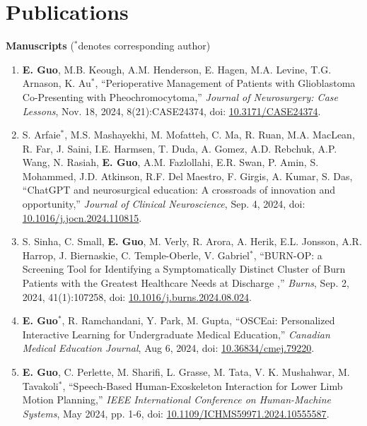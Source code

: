 \documentclass{article}
\begin{document}
\section*{\textcolor{my_colour}{Publications}}
\vspace{-.25em} \hrulefill \vspace{.25em}

\textbf{Manuscripts} ($^*$denotes corresponding author) \vspace{.5em}

\begin{enumerate}
    \item \textbf{E. Guo}, M.B. Keough, A.M. Henderson, E. Hagen, M.A. Levine, T.G. Arnason, K. Au$^*$, ``Perioperative Management of Patients with Glioblastoma Co-Presenting with Pheochromocytoma,'' \textit{Journal of Neurosurgery: Case Lessons}, Nov. 18, 2024, 8(21):CASE24374, doi: \href{https://thejns.org/doi/10.3171/CASE24374}{10.3171/CASE24374}.
    \item S. Arfaie$^*$, M.S. Mashayekhi, M. Mofatteh, C. Ma, R. Ruan, M.A. MacLean, R. Far, J. Saini, I.E. Harmsen, T. Duda, A. Gomez, A.D. Rebchuk, A.P. Wang, N. Rasiah, \textbf{E. Guo}, A.M. Fazlollahi, E.R. Swan, P. Amin, S. Mohammed, J.D. Atkinson, R.F. Del Maestro, F. Girgis, A. Kumar, S. Das, ``ChatGPT and neurosurgical education: A crossroads of innovation and opportunity,'' \textit{Journal of Clinical Neuroscience}, Sep. 4, 2024, doi: \href{https://doi.org/10.1016/j.jocn.2024.110815}{10.1016/j.jocn.2024.110815}.
    \item S. Sinha, C. Small, \textbf{E. Guo}, M. Verly, R. Arora, A. Herik, E.L. Jonsson, A.R. Harrop, J. Biernaskie, C. Temple-Oberle, V. Gabriel$^*$, ``BURN-OP: a Screening Tool for Identifying a Symptomatically Distinct Cluster of Burn Patients with the Greatest Healthcare Needs at Discharge ,'' \textit{Burns}, Sep. 2, 2024, 41(1):107258, doi: \href{https://doi.org/10.1016/j.burns.2024.08.024}{10.1016/j.burns.2024.08.024}.
    \item \textbf{E. Guo}$^*$, R. Ramchandani, Y. Park, M. Gupta, ``OSCEai: Personalized Interactive Learning for Undergraduate Medical Education,'' \textit{Canadian Medical Education Journal}, Aug 6, 2024, doi: \href{https://doi.org/10.36834/cmej.79220}{10.36834/cmej.79220}.
    \item \textbf{E. Guo}, C. Perlette, M. Sharifi, L. Grasse, M. Tata, V. K. Mushahwar, M. Tavakoli$^*$, ``Speech-Based Human-Exoskeleton Interaction for Lower Limb Motion Planning,''  \textit{IEEE International Conference on Human-Machine Systems}, May 2024, pp. 1-6, doi: \href{https://doi.org/10.1109/ICHMS59971.2024.10555587}{10.1109/ICHMS59971.2024.10555587}.

\end{enumerate}
\end{document}
